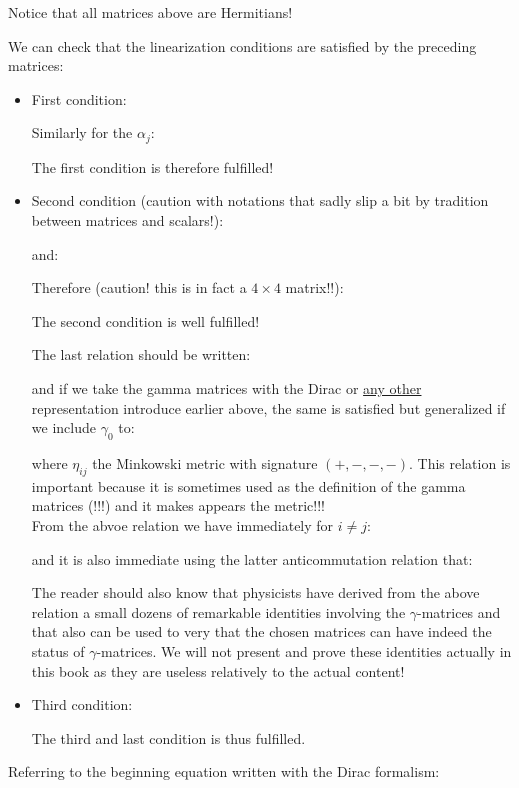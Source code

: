 	\begin{tcolorbox}[title=Remark,colframe=black,arc=10pt]
	Notice that all matrices above are Hermitians!
	\end{tcolorbox}
	We can check that the linearization conditions are satisfied by the preceding matrices:
	\begin{itemize}
		\item First condition:
		
		Similarly for the $\alpha_j$:
		
		The first condition is therefore fulfilled!
	
		\item Second condition (caution with notations that sadly slip a bit by tradition between matrices and scalars!):
		
		and:
		
		Therefore (caution! this is in fact a $4\times 4$ matrix!!):
		
		The second condition is well fulfilled!
		\begin{tcolorbox}[title=Remark,colframe=black,arc=10pt]
		\label{gamma anticommutation relations}The last relation should be written:
		
		and if we take the gamma matrices with the Dirac or \underline{any other} representation introduce earlier above, the same is satisfied but generalized if we include $\gamma_0$ to:
		
		where $\eta_{ij}$ the Minkowski metric with signature $(+, -, -, -)$. This relation is important because it is sometimes used as the definition of the gamma matrices (!!!) and it makes appears the metric!!!\\
		
		From the abvoe relation we have immediately for $i\neq j$:
		
		and it is also immediate using the latter anticommutation relation that:
		
		The reader should also know that physicists have derived from the above relation a small dozens of remarkable identities involving the $\gamma$-matrices and that also can be used to very that the chosen matrices can have indeed the status of $\gamma$-matrices. We will not present and prove these identities actually in this book as they are useless relatively to the actual content!
		\end{tcolorbox}
		
		\item Third condition:
		
		The third and last condition is thus fulfilled.
	\end{itemize}
	Referring to the beginning equation written with the Dirac formalism:
	
